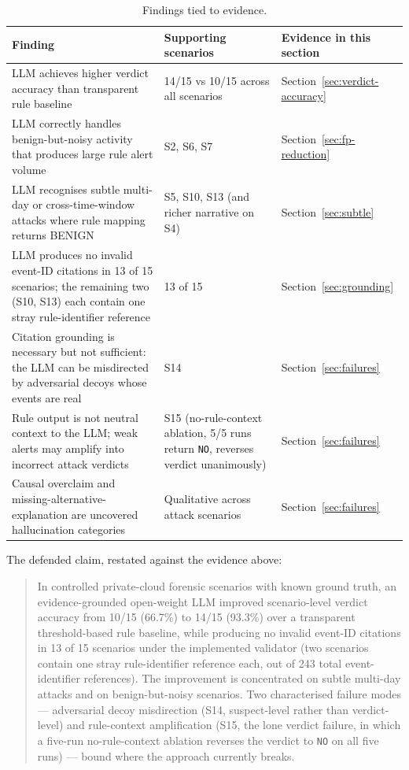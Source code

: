 \documentclass[conference]{IEEEtran}
\begin{document}
\begin{table}[ht]
\centering
\caption{Findings tied to evidence.}
\label{tab:findings}
\small
\begin{tabular}{L{0.42\textwidth}L{0.32\textwidth}L{0.18\textwidth}}
\toprule
\textbf{Finding} & \textbf{Supporting scenarios} & \textbf{Evidence in this section} \\
\midrule
LLM achieves higher verdict accuracy than transparent rule baseline & 14/15 vs 10/15 across all scenarios & Section~\ref{sec:verdict-accuracy} \\
LLM correctly handles benign-but-noisy activity that produces large rule alert volume & S2, S6, S7 & Section~\ref{sec:fp-reduction} \\
LLM recognises subtle multi-day or cross-time-window attacks where rule mapping returns BENIGN & S5, S10, S13 (and richer narrative on S4) & Section~\ref{sec:subtle} \\
LLM produces no invalid event-ID citations in 13 of 15 scenarios; the remaining two (S10, S13) each contain one stray rule-identifier reference & 13 of 15 & Section~\ref{sec:grounding} \\
Citation grounding is necessary but not sufficient: the LLM can be misdirected by adversarial decoys whose events are real & S14 & Section~\ref{sec:failures} \\
Rule output is not neutral context to the LLM; weak alerts may amplify into incorrect attack verdicts & S15 (no-rule-context ablation, 5/5 runs return \texttt{NO}, reverses verdict unanimously) & Section~\ref{sec:failures} \\
Causal overclaim and missing-alternative-explanation are uncovered hallucination categories & Qualitative across attack scenarios & Section~\ref{sec:failures} \\
\bottomrule
\end{tabular}
\end{table}

The defended claim, restated against the evidence above:

\begin{quote}
In controlled private-cloud forensic scenarios with known ground truth, an evidence-grounded open-weight LLM improved scenario-level verdict accuracy from 10/15 (66.7\%) to 14/15 (93.3\%) over a transparent threshold-based rule baseline, while producing no invalid event-ID citations in 13 of 15 scenarios under the implemented validator (two scenarios contain one stray rule-identifier reference each, out of 243 total event-identifier references). The improvement is concentrated on subtle multi-day attacks and on benign-but-noisy scenarios. Two characterised failure modes --- adversarial decoy misdirection (S14, suspect-level rather than verdict-level) and rule-context amplification (S15, the lone verdict failure, in which a five-run no-rule-context ablation reverses the verdict to \texttt{NO} on all five runs) --- bound where the approach currently breaks.
\end{quote}
\end{document}
